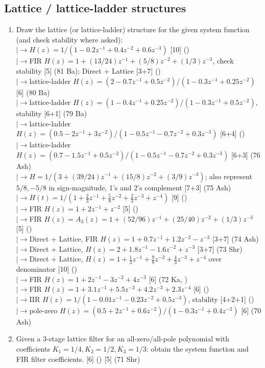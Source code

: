 \documentclass[12pt]{article}
\newcommand{\lb}{\\$\left|\rightarrow\right.$}
\begin{document}
  \subsection{Lattice / lattice-ladder structures}
    \begin{enumerate}[topsep=0pt, noitemsep]
      \item Draw the lattice (or lattice-ladder) structure for the given system function (and check stability where asked):
        \lb $H(z)=1/(1-0.2z^{-1}+0.4z^{-2}+0.6z^{-3})$ \hfill [10] ()
        \lb FIR $H(z)=1+(13/24)z^{-1}+(5/8)z^{-2}+(1/3)z^{-3}$, check stability \hfill [5] (81 Ba); Direct + Lattice \hfill [3+7] ()
        \lb lattice-ladder $H(z)=(2-0.7z^{-1}+0.5z^{-2})/(1-0.3z^{-1}+0.25z^{-2})$ \hfill [6] (80 Ba)
        \lb lattice-ladder $H(z)=(1-0.4z^{-1}+0.25z^{-2})/(1-0.3z^{-1}+0.5z^{-2})$, stability \hfill [6+1] (79 Ba)
        \lb lattice-ladder $H(z)=(0.5-2z^{-1}+3z^{-2})/(1-0.5z^{-1}-0.7z^{-2}+0.3z^{-3})$ \hfill [6+4] ()
        \lb lattice-ladder $H(z)=(0.7-1.5z^{-1}+0.5z^{-2})/(1-0.5z^{-1}-0.7z^{-2}+0.3z^{-3})$ \hfill [6+3] (76 Ash)
        \lb $H=1/(3+(39/24)z^{-1}+(15/8)z^{-2}+(3/9)z^{-3})$; also represent $5/8,-5/8$ in sign-magnitude, 1's and 2's complement \hfill [7+3] (75 Ash)
        \lb $H(t)=1/(1+\tfrac23 z^{-1}+\tfrac58 z^{-2}+\tfrac23 z^{-3}+z^{-4})$ \hfill [9] ()
        \lb FIR $H(z)=1+2z^{-1}+z^{-2}$ \hfill [5] ()
        \lb FIR $H(z)=A_3(z)=1+(52/96)z^{-1}+(25/40)z^{-2}+(1/3)z^{-3}$ \hfill [5] ()
        \lb Direct + Lattice, FIR $H(z)=1+0.7z^{-1}+1.2z^{-2}-z^{-3}$ \hfill [3+7] (74 Ash)
        \lb Direct + Lattice, $H(z)=2+1.8z^{-1}-1.6z^{-2}+z^{-3}$ \hfill [3+7] (73 Shr)
        \lb Direct + Lattice, $H(z)=1+\tfrac13 z^{-1}+\tfrac98 z^{-2}+\tfrac43 z^{-3}+z^{-4}$ over denominator \hfill [10] ()
        \lb FIR $H(z)=1+2z^{-1}-3z^{-2}+4z^{-3}$ \hfill [6] (72 Ka, )
        \lb FIR $H(z)=1+3.1z^{-1}+5.5z^{-2}+4.2z^{-3}+2.3z^{-4}$ \hfill [6] ()
        \lb IIR $H(z)=1/(1-0.01z^{-1}-0.23z^{-2}+0.5z^{-3})$, stability \hfill [4+2+1] ()
        \lb pole-zero $H(z)=(0.5+2z^{-1}+0.6z^{-2})/(1-0.3z^{-1}+0.4z^{-2})$ \hfill [6] (70 Ash)

      \item Given a 3-stage lattice filter for an all-zero/all-pole polynomial with coefficients $K_1=1/4,K_2=1/2,K_3=1/3$: obtain the system function and FIR filter coefficients. \hfill [6] () [5] (71 Shr)
    \end{enumerate}
\end{document}
